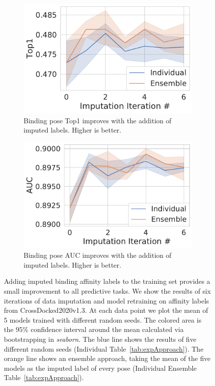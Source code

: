 \documentclass[journal=jcim,manuscript=article]{achemso}
\begin{document}
\begin{figure}[tbph]
    \begin{subfigure}[t]{0.48\textwidth}
        \centering
        \includegraphics[width=\linewidth]{figures/InitialImpTop1.pdf}
        \caption{Binding pose Top1 improves with the addition of imputed labels. Higher is better.}
    \end{subfigure}
    \hfill
    \begin{subfigure}[t]{0.48\textwidth}
        \centering
        \includegraphics[width=\linewidth]{figures/InitialImpAUC.pdf}
        \caption{Binding pose AUC improves with the addition of imputed labels. Higher is better.}
    \end{subfigure}
    \caption{Adding imputed binding affinity labels to the training set provides a small improvement to all predictive tasks. We show the results of six iterations of data imputation and model retraining on affinity labels from CrossDocked2020v1.3. At each data point we plot the mean of 5 models trained with different random seeds. The colored area is the 95\% confidence interval around the mean calculated via bootstrapping in \textit{seaborn}. The blue line shows the results of five different random seeds (Individual Table~\ref{tab:expApproach}). The orange line shows an ensemble approach, taking the mean of the five models as the imputed label of every pose (Individual Ensemble Table~\ref{tab:expApproach}).}
    \label{fig:initialImp}
\end{figure}
\end{document}

